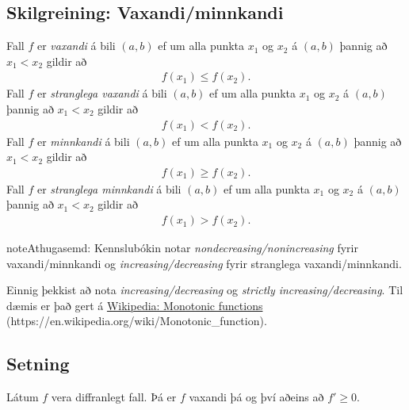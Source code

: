 \documentclass[b5paper,11pt,icelandic]{sphinxmanual}
\begin{document}
\subsection{Skilgreining: Vaxandi/minnkandi}
\label{kafli03:index-9}\label{kafli03:skilgreining-vaxandi-minnkandi}
Fall \(f\) er \emph{vaxandi} á bili \((a,b)\) ef um
alla punkta \(x_1\) og \(x_2\) á \((a,b)\) þannig að
\(x_1 < x_2\) gildir að
\begin{equation*}
\begin{split}f(x_1) \leq f(x_2).\end{split}
\end{equation*}
Fall \(f\) er \emph{stranglega vaxandi} á bili \((a,b)\)
ef um alla punkta \(x_1\) og \(x_2\) á \((a,b)\) þannig að
\(x_1 < x_2\) gildir að
\begin{equation*}
\begin{split}f(x_1) < f(x_2).\end{split}
\end{equation*}
Fall \(f\) er \emph{minnkandi} á bili \((a,b)\) ef um
alla punkta \(x_1\) og \(x_2\) á \((a,b)\) þannig að
\(x_1 < x_2\) gildir að
\begin{equation*}
\begin{split}f(x_1) \geq f(x_2).\end{split}
\end{equation*}
Fall \(f\) er \emph{stranglega minnkandi} á bili
\((a,b)\) ef um alla punkta \(x_1\) og \(x_2\) á
\((a,b)\) þannig að \(x_1 < x_2\) gildir að
\begin{equation*}
\begin{split}f(x_1) > f(x_2).\end{split}
\end{equation*}
\begin{notice}{note}{Athugasemd:}
Kennslubókin notar \emph{nondecreasing/nonincreasing} fyrir vaxandi/minnkandi og
\emph{increasing/decreasing} fyrir stranglega vaxandi/minnkandi.

Einnig þekkist að nota \emph{increasing/decreasing} og \emph{strictly increasing/decreasing}.
Til dæmis er það gert á \href{https://en.wikipedia.org/wiki/Monotonic\_function}{Wikipedia: Monotonic functions} (https://en.wikipedia.org/wiki/Monotonic\_function).
\end{notice}


\subsection{Setning}
\label{kafli03:vaxandieoae}\label{kafli03:id15}
Látum \(f\) vera diffranlegt fall. Þá er \(f\) vaxandi þá og því
aðeins að \(f' \geq 0\).
\end{document}
